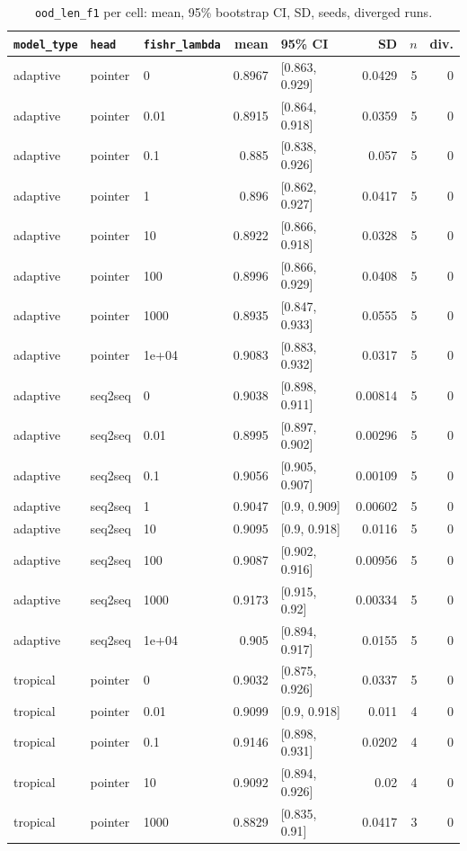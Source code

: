 \documentclass[10pt]{article}
\begin{document}
{\small
\begin{longtable}{lllrlrrr}
\caption{\texttt{ood\_len\_f1} per cell: mean, 95\% bootstrap CI, SD, seeds, diverged runs.}\label{tab:summary-ood_len_f1}\\
\toprule
\texttt{model\_type} & \texttt{head} & \texttt{fishr\_lambda} & mean & 95\% CI & SD & $n$ & div.\\
\midrule
\endhead
adaptive & pointer & 0 & 0.8967 & [0.863, 0.929] & 0.0429 & 5 & 0\\
adaptive & pointer & 0.01 & 0.8915 & [0.864, 0.918] & 0.0359 & 5 & 0\\
adaptive & pointer & 0.1 & 0.885 & [0.838, 0.926] & 0.057 & 5 & 0\\
adaptive & pointer & 1 & 0.896 & [0.862, 0.927] & 0.0417 & 5 & 0\\
adaptive & pointer & 10 & 0.8922 & [0.866, 0.918] & 0.0328 & 5 & 0\\
adaptive & pointer & 100 & 0.8996 & [0.866, 0.929] & 0.0408 & 5 & 0\\
adaptive & pointer & 1000 & 0.8935 & [0.847, 0.933] & 0.0555 & 5 & 0\\
adaptive & pointer & 1e+04 & 0.9083 & [0.883, 0.932] & 0.0317 & 5 & 0\\
adaptive & seq2seq & 0 & 0.9038 & [0.898, 0.911] & 0.00814 & 5 & 0\\
adaptive & seq2seq & 0.01 & 0.8995 & [0.897, 0.902] & 0.00296 & 5 & 0\\
adaptive & seq2seq & 0.1 & 0.9056 & [0.905, 0.907] & 0.00109 & 5 & 0\\
adaptive & seq2seq & 1 & 0.9047 & [0.9, 0.909] & 0.00602 & 5 & 0\\
adaptive & seq2seq & 10 & 0.9095 & [0.9, 0.918] & 0.0116 & 5 & 0\\
adaptive & seq2seq & 100 & 0.9087 & [0.902, 0.916] & 0.00956 & 5 & 0\\
adaptive & seq2seq & 1000 & 0.9173 & [0.915, 0.92] & 0.00334 & 5 & 0\\
adaptive & seq2seq & 1e+04 & 0.905 & [0.894, 0.917] & 0.0155 & 5 & 0\\
tropical & pointer & 0 & 0.9032 & [0.875, 0.926] & 0.0337 & 5 & 0\\
tropical & pointer & 0.01 & 0.9099 & [0.9, 0.918] & 0.011 & 4 & 0\\
tropical & pointer & 0.1 & 0.9146 & [0.898, 0.931] & 0.0202 & 4 & 0\\
tropical & pointer & 10 & 0.9092 & [0.894, 0.926] & 0.02 & 4 & 0\\
tropical & pointer & 1000 & 0.8829 & [0.835, 0.91] & 0.0417 & 3 & 0\\

\end{longtable}}
\end{document}
